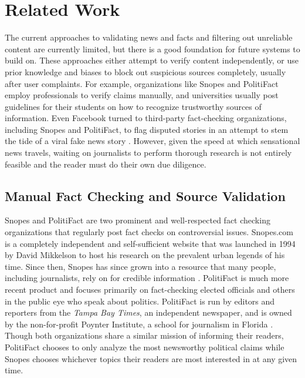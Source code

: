 \chapter{Related Work}

The current approaches to validating news and facts and filtering out unreliable content are currently limited, but there is a good foundation for future systems to build on.  These approaches either attempt to verify content independently, or use prior knowledge and biases to block out suspicious sources completely, usually after user complaints.  For example, organizations like Snopes and PolitiFact employ professionals to verify claims manually, and universities usually post guidelines for their students on how to recognize trustworthy sources of information.  Even Facebook turned to third-party fact-checking organizations, including Snopes and PolitiFact, to flag disputed stories in an attempt to stem the tide of a viral fake news story \cite{fighingFakeNews}.  However, given the speed at which sensational news travels, waiting on journalists to perform thorough research is not entirely feasible and the reader must do their own due diligence.


\section{Manual Fact Checking and Source Validation}

Snopes and PolitiFact are two prominent and well-respected fact checking organizations that regularly post fact checks on controversial issues.  Snopes.com is a completely independent and self-sufficient website that was launched in 1994 by David Mikkelson to host his research on the prevalent urban legends of his time.  Since then, Snopes has since grown into a resource that many people, including journalists, rely on for credible information \cite{snopesAbout}.  PolitiFact is much more recent product and focuses primarily on fact-checking elected officials and others in the public eye who speak about politics.  PolitiFact is run by editors and reporters from the \textit{Tampa Bay Times}, an independent newspaper, and is owned by the non-for-profit Poynter Institute, a school for journalism in Florida \cite{politifactAbout}.  Though both organizations share a similar mission of informing their readers, PolitiFact chooses to only analyze the most newsworthy political claims while Snopes chooses whichever topics their readers are most interested in at any given time.

